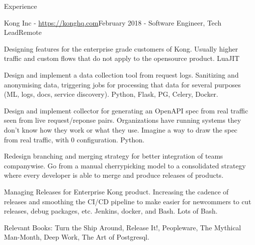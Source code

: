\documentclass{resume} %
\begin{document}
\begin{rSection}{Experience}
  \begin{rSubsection}{Kong Inc - \url{https://konghq.com}}{February 2018 - }{Software Engineer, Tech Lead}{Remote}
  \item Designing features for the enterprise grade customers of
    Kong. Usually higher traffic and custom flows that do not apply to
    the opensource product. LuaJIT
  \item Design and implement a data collection tool from request
    logs. Sanitizing and anonymising data, triggering jobs for
    processing that data for several purposes (ML, logs, docs,
    service discovery). Python, Flask, PG, Celery, Docker.
  \item Design and implement collector for generating an OpenAPI spec
    from real traffic seen from live request/reponse
    pairs. Organizations have running systems they don't know how they
    work or what they use. Imagine a way to draw the spec from real
    traffic, with 0 configuration. Python.
  \item Redesign branching and merging strategy for better integration
    of teams companywise. Go from a manual cherrypicking model to a
    consolidated strategy where every developer is able to merge and
    produce releases of products.
  \item Managing Releases for Enterprise Kong product. Increasing the
    cadence of releases and smoothing the CI/CD pipeline to make easier
    for newcommers to cut releases, debug packages, etc. Jenkins,
    docker, and Bash. Lots of Bash.
  \item Relevant Books: Turn the Ship Around, Release It!, Peopleware,
    The Mythical Man-Month, Deep Work, The Art of Postgresql.
  \end{rSubsection}




\end{rSection}
\end{document}

